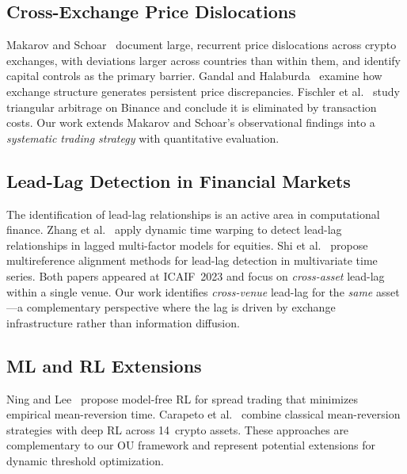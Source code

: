 \documentclass[sigconf,nonacm=false]{acmart}
\begin{document}
\subsection{Cross-Exchange Price Dislocations}

Makarov and Schoar~\cite{makarov2020trading} document large, recurrent price dislocations across crypto exchanges, with deviations larger across countries than within them, and identify capital controls as the primary barrier. Gandal and Halaburda~\cite{gandal2021key} examine how exchange structure generates persistent price discrepancies. Fischler et al.~\cite{fischler2024wish} study triangular arbitrage on Binance and conclude it is eliminated by transaction costs. Our work extends Makarov and Schoar's observational findings into a \emph{systematic trading strategy} with quantitative evaluation.

\subsection{Lead-Lag Detection in Financial Markets}

The identification of lead-lag relationships is an active area in computational finance. Zhang et al.~\cite{zhang2023dtw} apply dynamic time warping to detect lead-lag relationships in lagged multi-factor models for equities. Shi et al.~\cite{shi2023multireference} propose multireference alignment methods for lead-lag detection in multivariate time series. Both papers appeared at ICAIF~2023 and focus on \emph{cross-asset} lead-lag within a single venue. Our work identifies \emph{cross-venue} lead-lag for the \emph{same} asset---a complementary perspective where the lag is driven by exchange infrastructure rather than information diffusion.

\subsection{ML and RL Extensions}

Ning and Lee~\cite{ning2024advanced} propose model-free RL for spread trading that minimizes empirical mean-reversion time. Carapeto et al.~\cite{carapeto2024deep} combine classical mean-reversion strategies with deep RL across 14~crypto assets. These approaches are complementary to our OU framework and represent potential extensions for dynamic threshold optimization.

\end{document}
